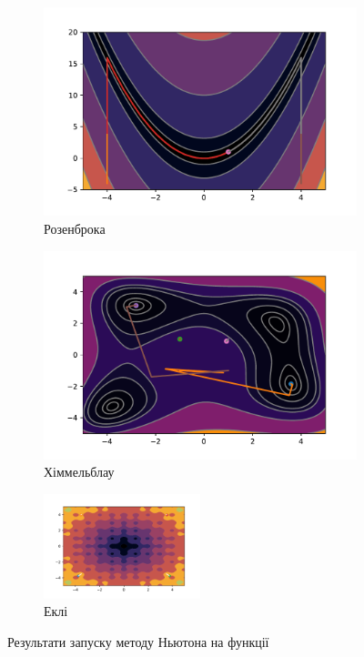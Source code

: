 \begin{figure}[h!]
    \begin{subfigure}{0.5\textwidth}
        \includegraphics[width=\textwidth, trim=1cm 0.5cm 1.3cm 1cm, clip]{assets/Newton/rosenbrock.pdf}
        \caption{Розенброка}
    \end{subfigure}
    \begin{subfigure}{0.5\textwidth}
        \includegraphics[width=\textwidth, trim=1cm 0.5cm 1.3cm 1cm, clip]{assets/Newton/himmelblau.pdf}
        \caption{Хіммельблау}
    \end{subfigure}
    \begin{subfigure}{\textwidth}
        \centering
        \includegraphics[width=0.5\textwidth, trim=1cm 0.5cm 1.3cm 1cm, clip]{assets/Newton/ackley.pdf}
        \caption{Еклі}
    \end{subfigure}
    \caption{Результати запуску методу Ньютона на функції}
\end{figure}

